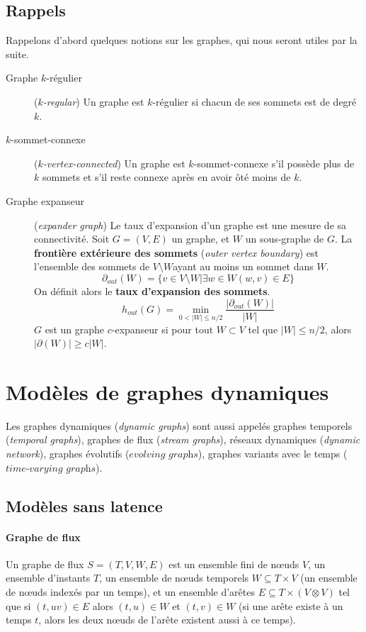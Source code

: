 \documentclass[12pt,a4paper]{article}
\begin{document}
\subsection{Rappels}
Rappelons d'abord quelques notions sur les graphes, qui nous seront
utiles par la suite.

\begin{description}
\item[Graphe \(k\)-régulier] (\textit{\(k\)-regular}) Un graphe est
  \(k\)-régulier si chacun de ses sommets est de degré \(k\).
\item[\(k\)-sommet-connexe] (\textit{\(k\)-vertex-connected}) Un
  graphe est \(k\)-sommet-connexe s'il possède plus de \(k\) sommets
  et s'il reste connexe après en avoir ôté moins de \(k\).
\item[Graphe expanseur] (\textit{expander graph}) Le taux d'expansion
  d'un graphe est une mesure de sa connectivité. Soit \(G = (V, E)\)
  un graphe, et \(W\) un sous-graphe de \(G\). La \textbf{frontière
    extérieure des sommets} (\textit{outer vertex boundary}) est
  l'ensemble des sommets de \(V \setminus W\)ayant au moins un sommet
  dans \(W\).
  \[\partial_{out}(W) = \{v \in V \setminus W | \exists w \in W (w, v)
    \in E\}\]
  On définit alors le \textbf{taux d'expansion des sommets}.
  \[h_{out}(G) = \min_{0 < |W| \leq n/2}\frac{|\partial_{out}(W)|}{|W|}\]
  \(G\) est un graphe \(c\)-expanseur si pour tout \(W \subset V\) tel
  que \(|W| \leq n / 2\), alors \(|\partial(W)| \geq c |W|\).
\end{description}

\section{Modèles de graphes dynamiques}

Les graphes dynamiques (\textit{dynamic graphs}) sont aussi appelés
graphes temporels (\textit{temporal graphs}), graphes de flux
(\textit{stream graphs}), réseaux dynamiques (\textit{dynamic
  network}), graphes évolutifs (\(\textit{evolving graphs}\)),
graphes variants avec le temps (\(\textit{time-varying graphs}\)).

\subsection{Modèles sans latence}

\paragraph{Graphe de flux}\cite{latapy2017stream} Un graphe de flux
\(S = (T, V, W, E)\) est un ensemble fini de nœuds \(V\), un ensemble
d'instants \(T\), un ensemble de nœuds temporels
\(W \subseteq T \times V\) (un ensemble de nœuds indexés par un
temps), et un ensemble d'arêtes \(E \subseteq T \times (V \otimes V)\)
tel que si \((t, uv) \in E\) alors \((t, u) \in W\) et
\((t, v) \in W\) (si une arête existe à un temps \(t\), alors les deux
nœuds de l'arête existent aussi à ce temps).
\end{document}

